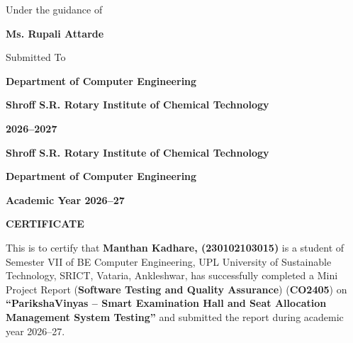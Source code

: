 \documentclass{InternshipReport}
\begin{document}
\begin{titlepage}
\begin{center}
        \vspace{5mm}
        {\fontsize{12}{15}\selectfont Under the guidance of\par}
        \vspace{2mm}
        {\fontsize{13}{16}\selectfont\textbf{Ms. Rupali Attarde}\par}
        
        \vspace{5mm}
        {\fontsize{12}{15}\selectfont Submitted To\par}
        \vspace{2mm}
        {\fontsize{13}{16}\selectfont\textbf{Department of Computer Engineering}\par}
        \vspace{1mm}
        {\fontsize{13}{16}\selectfont\textbf{Shroff S.R. Rotary Institute of Chemical Technology}\par}
        \vspace{1mm}
        {\fontsize{12}{15}\selectfont\textbf{2026--2027}\par}
    \end{center}
\end{titlepage}

\clearpage
\thispagestyle{empty}
\begin{center}
    {\fontsize{14}{17}\selectfont\textbf{Shroff S.R. Rotary Institute of Chemical Technology}\par}
    \vspace{2mm}
    {\fontsize{14}{17}\selectfont\textbf{Department of Computer Engineering}\par}
    \vspace{2mm}
    {\fontsize{13}{16}\selectfont\textbf{Academic Year 2026--27}\par}
    
    \vspace{14mm}
    {\fontsize{16}{20}\selectfont\textbf{CERTIFICATE}\par}
\end{center}

\vspace{12mm}
\noindent
This is to certify that \textbf{Manthan Kadhare, (230102103015)} is a student of Semester VII of BE Computer Engineering, UPL University of Sustainable Technology, SRICT, Vataria, Ankleshwar, has successfully completed a Mini Project Report (\textbf{Software Testing and Quality Assurance}) (\textbf{CO2405}) on \textbf{“ParikshaVinyas -- Smart Examination Hall and Seat Allocation Management System Testing”} and submitted the report during academic year 2026--27.
\end{document}
